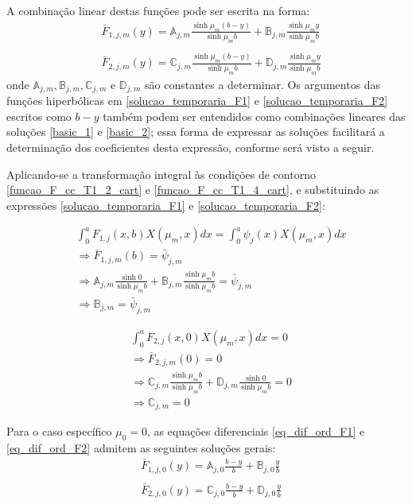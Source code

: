 A combinação linear destas funções pode ser escrita na forma:
\begin{align}
	& \bar{F}_{1,j,m}(y) = \mathbb{A}_{j,m}\frac{\sinh\mu_m (b - y)}{\sinh\mu_m b} + \mathbb{B}_{j,m}\frac{\sinh\mu_m y}{\sinh\mu_m b} \label{solucao_temporaria_F1}\\ \nonumber \\
	& \bar{F}_{2,j,m}(y) = \mathbb{C}_{j,m}\frac{\sinh\mu_m (b - y)}{\sinh\mu_m b} + \mathbb{D}_{j,m}\frac{\sinh\mu_m y}{\sinh\mu_m b} \label{solucao_temporaria_F2}
\end{align} 
onde $\mathbb{A}_{j,m}, \mathbb{B}_{j,m}, \mathbb{C}_{j,m}$ e $\mathbb{D}_{j,m}$ são constantes a determinar. Os argumentos das funções hiperbólicas em \eqref{solucao_temporaria_F1} e \eqref{solucao_temporaria_F2} escritos como $b - y$ também podem ser entendidos como combinações lineares das soluções \eqref{basic_1} e \eqref{basic_2}; essa forma de expressar as soluções facilitará a determinação dos coeficientes desta expressão, conforme será visto a seguir.

Aplicando-se a transformação integral às condições de contorno \eqref{funcao_F_cc_T1_2_cart} e \eqref{funcao_F_cc_T1_4_cart}, e substituindo as expressões \eqref{solucao_temporaria_F1} e \eqref{solucao_temporaria_F2}:

\begin{align}
	& \int_0^a F_{1,j}(x, b)X(\mu_m, x)dx = \int_0^a \psi_j(x) X(\mu_m, x)dx \nonumber \\
	& \Rightarrow \bar{F}_{1,j,m}(b) = \bar{\psi}_{j, m} \nonumber \\
	& \Rightarrow \mathbb{A}_{j,m}\frac{\sinh 0}{\sinh\mu_m b} + \mathbb{B}_{j,m}\frac{\sinh \mu_m b}{\sinh\mu_m b} = \bar{\psi}_{j, m} \nonumber \\
	& \Rightarrow \mathbb{B}_{j,m} = \bar{\psi}_{j, m} \label{resultado_cte_5}
\end{align} 

\begin{align}
	& \int_0^a F_{2,j}(x, 0)X(\mu_m, x)dx = 0 \nonumber \\
	& \Rightarrow \bar{F}_{2,j,m}(0) = 0 \nonumber \\
	& \Rightarrow \mathbb{C}_{j,m}\frac{\sinh\mu_m b}{\sinh\mu_m b} + \mathbb{D}_{j,m}\frac{\sinh 0}{\sinh\mu_m b} = 0 \nonumber \\
	& \Rightarrow \mathbb{C}_{j,m} = 0 \label{resultado_cte_8}
\end{align} 

Para o caso específico $\mu_0 = 0$, as equações diferenciais \eqref{eq_dif_ord_F1} e \eqref{eq_dif_ord_F2} admitem as seguintes soluções gerais:
\begin{align}
	& \bar{F}_{1,j,0}(y) = \mathbb{A}_{j,0}\frac{b - y}{b} + \mathbb{B}_{j,0}\frac{y}{b} \label{solucao_temporaria_F1_0}\\ \nonumber \\
	& \bar{F}_{2,j,0}(y) = \mathbb{C}_{j,0}\frac{b - y}{b} + \mathbb{D}_{j,0}\frac{y}{b} \label{solucao_temporaria_F2_0}
\end{align} 

